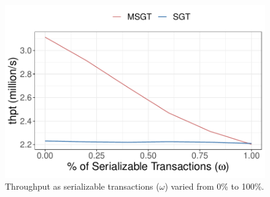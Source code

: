 \begin{figure}[htbp]
    \centering
    \includegraphics[width=0.6\linewidth]{figs/ycsb_isolation_thpt}%
    \caption{Throughput as serializable transactions ($\omega$) varied from 0\% to 100\%.}
    \label{fig:isolation-a}
\end{figure}


